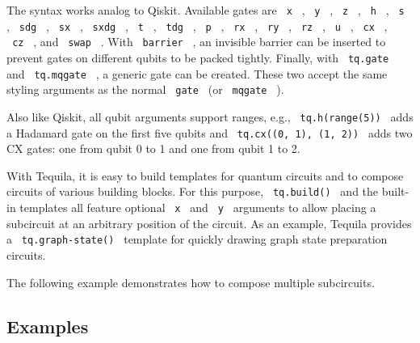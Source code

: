 The syntax works analog to Qiskit. Available gates are \texttt{\ x\ } ,
\texttt{\ y\ } , \texttt{\ z\ } , \texttt{\ h\ } , \texttt{\ s\ } ,
\texttt{\ sdg\ } , \texttt{\ sx\ } , \texttt{\ sxdg\ } , \texttt{\ t\ }
, \texttt{\ tdg\ } , \texttt{\ p\ } , \texttt{\ rx\ } , \texttt{\ ry\ }
, \texttt{\ rz\ } , \texttt{\ u\ } , \texttt{\ cx\ } , \texttt{\ cz\ } ,
and \texttt{\ swap\ } . With \texttt{\ barrier\ } , an invisible barrier
can be inserted to prevent gates on different qubits to be packed
tightly. Finally, with \texttt{\ tq.gate\ } and \texttt{\ tq.mqgate\ } ,
a generic gate can be created. These two accept the same styling
arguments as the normal \texttt{\ gate\ } (or \texttt{\ mqgate\ } ).

Also like Qiskit, all qubit arguments support ranges, e.g.,
\texttt{\ tq.h(range(5))\ } adds a Hadamard gate on the first five
qubits and \texttt{\ tq.cx((0,\ 1),\ (1,\ 2))\ } adds two CX gates: one
from qubit 0 to 1 and one from qubit 1 to 2.

With Tequila, it is easy to build templates for quantum circuits and to
compose circuits of various building blocks. For this purpose,
\texttt{\ tq.build()\ } and the built-in templates all feature optional
\texttt{\ x\ } and \texttt{\ y\ } arguments to allow placing a
subcircuit at an arbitrary position of the circuit. As an example,
Tequila provides a \texttt{\ tq.graph-state()\ } template for quickly
drawing graph state preparation circuits.

The following example demonstrates how to compose multiple subcircuits.

\begin{Shaded}
\begin{Highlighting}[]

\NormalTok{    ),}
\NormalTok{)}
\end{Highlighting}
\end{Shaded}


\subsection{Examples}\label{examples}


